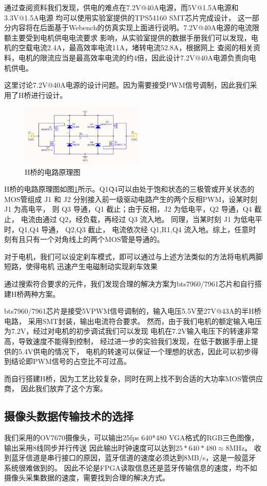 \documentclass[a4paper]{paper}
\begin{document}
通过查阅资料我们发现，供电的难点在7.2V@40A电源，而5V@1.5A电源和3.3V@1.5A电源
均可以使用实验室提供的TPS54160 SMT芯片完成设计，
这一部分内容将在后面基于Webench的仿真实现上面进行说明。7.2V@40A电源的电流限额主要受到电机供电电流要求
影响，从实验室提供的数据手册我们可以发现，电机的空载电流2.4A，最高效率电流11A，堵转电流52.8A，根据网上
查阅的相关资料，电机的限流应当是最高效率电流的约4倍，因此设计7.2V@40A电源负责向电机供电。

这里讨论7.2V@40A电源的设计问题。因为需要接受PWM信号调制，因此我们采用了H桥进行设计。
\begin{figure}
    \centering
    \includegraphics[width=60mm]{HBridge.jpg}
    \caption{H桥的电路原理图}
    \label{H-bridge}
\end{figure}
H桥的电路原理图如图\ref{H-bridge}所示。Q1\~Q4可以由处于饱和状态的三极管或开关状态的MOS管组成 
J1 和 J2 分别接入前一级驱动电路产生的两个反相PWM，设某时刻 J1 为高电平，
则 Q3 导通，Q1 截止；由于反相，J2 为低电平，Q2 导通，Q4 截止，
电流由通过 Q2，经负载，再经过 Q3 流入地。
同理，当某时刻 J1 为低电平时，Q1,Q4 导通， Q2,Q3 截止，
电流依次经 Q1,R1,Q4 流入地。综上，任意时刻有且只有一个对角线上的两个MOS管是导通的。

对于电机，我们可以设定刹车模式，即可以通过与上述方法类似的方法将电机两脚短路，使得电机
迅速产生电磁制动实现刹车效果

通过搜索符合要求的元件，我们发现合理的解决方案为bts7960/7961芯片和自行搭建H桥两种方案。

bts7960/7961芯片是接受5VPWM信号调制的，输入电压5.5V至27V@43A的半H桥电路，
采用SMT封装，输出电流符合要求。
然而，由于我们电机的额定输入电压为7.2V，经过对电机的初步调试我们可以发现
电机在7.2V输入电压下的转速非常高，导致速度不能得到控制，
经过进一步的实验我们发现，在低于数据手册上提供的5.4V供电的情况下，
电机的转速可以保证一个理想的状态，因此可以初步得到结论即PWM信号的占空比不可过高。

而自行搭建H桥，因为工艺比较复杂，同时在网上找不到合适的大功率MOS管供应商，
因此我们放弃了这个方案。


\subsection{摄像头数据传输技术的选择}
我们采用的OV7670摄像头，可以输出25fps 640*480 VGA格式的RGB三色图像，输出采用8线同步并行传送
因此输出时钟速度可以达到$25*640*480 \approx 8\mathrm{MHz}$。
收到蓝牙信道是串行接口的原因，蓝牙信道的速度必须达到8MB/s，这是一般蓝牙系统很难做到的。
因此不论是FPGA读取信息还是蓝牙传输信息的速度，均不如摄像头采集数据的速度，需要找到合理的解决方式。
\end{document}
